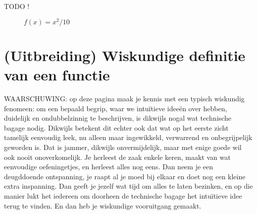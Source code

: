 \documentclass{ximera}
\begin{document}
TODO !
\begin{figure}%
    \centering
    \begin{minipage}{0.45\textwidth}
        \centering
        
        
        
        \caption{$f(x) = x + 5$}
    \end{minipage}\hfill
    \begin{minipage}{0.45\textwidth}
        \centering
        
        
        \caption{$f(x) = x^2/10$}
    \end{minipage}
\end{figure}



\pagebreak
\section{(Uitbreiding) Wiskundige definitie van een functie}

{\scriptsize 
    
    WAARSCHUWING: op deze pagina maak je kennis met een typisch wiskundig fenomeen: om een bepaald begrip, waar we intuïtieve ideeën over hebben,   duidelijk en ondubbelzinnig te beschrijven, is dikwijls nogal wat technische bagage nodig. Dikwijls betekent dit echter ook dat wat op het eerste zicht tamelijk eenvoudig leek, nu alleen maar ingewikkeld, verwarrend en onbegrijpelijk geworden is. Dat is jammer, dikwijls onvermijdelijk, maar met enige goede wil ook nooit onoverkomelijk. Je herleest de zaak enkele keren, maakt van wat eenvoudige oefeningetjes, en herleest alles nog eens. Dan neem je een deugddoende ontspanning, je raapt al je moed bij elkaar en doet nog een kleine extra inspanning. Dan geeft je jezelf wat tijd om alles te laten bezinken, en op die manier lukt het iedereen om doorheen de technische bagage het intuïtieve idee terug te vinden. En dan heb je wiskundige vooruitgang gemaakt.  

}
\end{document}

